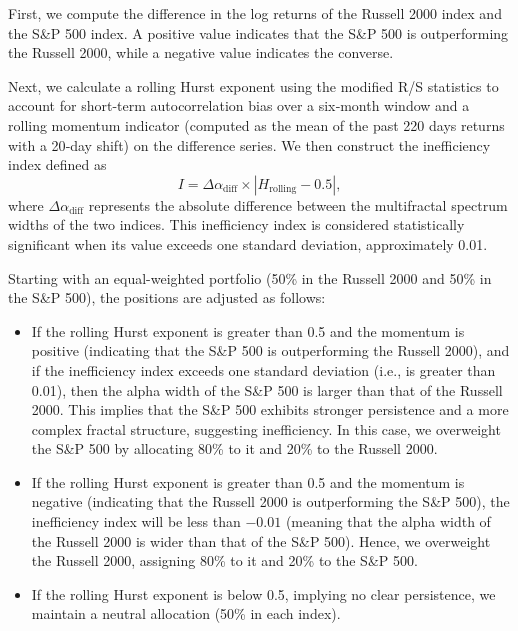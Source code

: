 \documentclass[11pt]{extarticle}
\begin{document}
First, we compute the difference in the log returns of the Russell 2000 index and the S\&P 500 index. A positive value
indicates that the S\&P 500 is outperforming the Russell 2000, while a negative value indicates the converse.

Next, we calculate a rolling Hurst exponent using the modified R/S statistics to account for short-term autocorrelation
bias over a six‐month window and a rolling momentum indicator (computed as the mean of the past 220 days returns with
a 20‐day shift) on the difference series. We then construct the inefficiency index defined as
\[
I = \Delta\alpha_{\text{diff}} \times \left|H_{\text{rolling}} - 0.5\right|,
\]
where \(\Delta \alpha_{\text{diff}}\) represents the absolute difference between the multifractal spectrum widths of the two
indices. This inefficiency index is considered statistically significant when its value exceeds one standard deviation, approximately 0.01.

Starting with an equal-weighted portfolio (50\% in the Russell 2000 and 50\% in the S\&P 500), the positions are adjusted as follows:

\begin{itemize}
    \item If the rolling Hurst exponent is greater than 0.5 and the momentum is positive (indicating that the S\&P 500 is
    outperforming the Russell 2000), and if the inefficiency index exceeds one standard deviation (i.e., is greater than 0.01),
    then the alpha width of the S\&P 500 is larger than that of the Russell 2000. This implies that the S\&P 500 exhibits stronger
    persistence and a more complex fractal structure, suggesting inefficiency. In this case, we overweight the S\&P 500 by allocating
    80\% to it and 20\% to the Russell 2000.

    \item If the rolling Hurst exponent is greater than 0.5 and the momentum is negative (indicating that the Russell 2000 is
    outperforming the S\&P 500), the inefficiency index will be less than \(-0.01\) (meaning that the alpha width of the
    Russell 2000 is wider than that of the S\&P 500). Hence, we overweight the Russell 2000, assigning 80\% to it and 20\% to the S\&P 500.

    \item If the rolling Hurst exponent is below 0.5, implying no clear persistence, we maintain a neutral allocation (50\% in each index).
\end{itemize}
\end{document}
